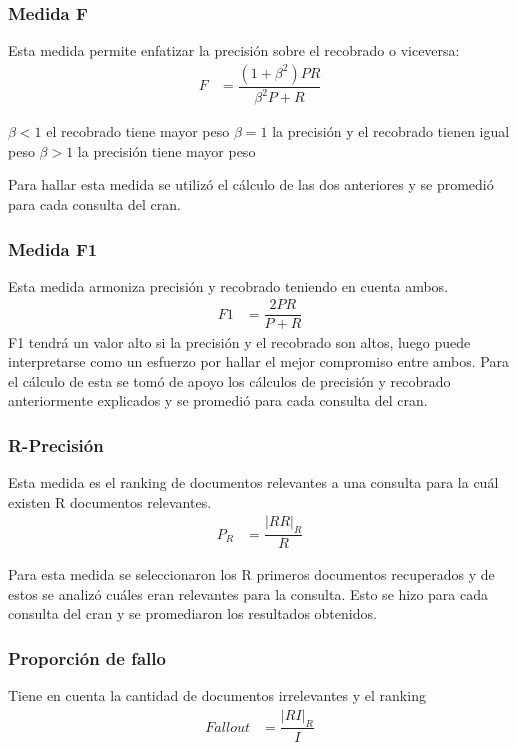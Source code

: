 \documentclass[runningheads]{llncs}
\begin{document}
\subsubsection{Medida F}

Esta medida permite enfatizar la precisión sobre el recobrado o viceversa:
	\begin{align*}
	F&=\dfrac{(1+ \beta^{2})PR}{\beta^{2} P + R}
	\end{align*}
	
$ \beta < 1 $ el recobrado tiene mayor peso
$ \beta = 1 $ la precisión y el recobrado tienen igual peso
$ \beta > 1 $ la precisión tiene mayor peso

Para hallar esta medida se utilizó el cálculo de las dos anteriores  y se promedió para cada consulta del cran.
\subsubsection{Medida F1}
Esta medida armoniza precisión y recobrado teniendo en cuenta ambos.
	\begin{align*}
	F1&=\dfrac{2PR}{P + R}
	\end{align*}
	F1 tendrá un valor alto si la precisión y el recobrado son altos, luego puede interpretarse como un esfuerzo por hallar el mejor compromiso entre ambos. Para el cálculo de esta se tomó de apoyo los cálculos de precisión y recobrado anteriormente explicados y se promedió para cada consulta del cran.
	
\subsubsection{R-Precisión}

Esta medida es el ranking de documentos relevantes a una consulta para la cuál existen R documentos relevantes.
	\begin{align*}
	P_{R}&=\dfrac{|RR|_{R}}{R}
	\end{align*}
	
	Para esta medida se seleccionaron los R primeros documentos recuperados y de estos se analizó cuáles eran relevantes para la consulta. Esto se hizo para cada consulta del cran y se promediaron los resultados obtenidos.

\subsubsection{Proporción de fallo}
Tiene en cuenta la cantidad de documentos irrelevantes y el ranking
	\begin{align*}
	Fallout&=\dfrac{|RI|_{R}}{I}
	\end{align*}
\end{document}
